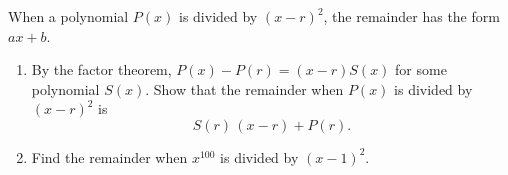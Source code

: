 When a polynomial $P(x)$ is divided by $(x-r)^2$, the remainder has the form $ax+b$.
\begin{enumerate}
\item[(a)] By the factor theorem, $P(x)-P(r)=(x-r)S(x)$ for some polynomial $S(x)$. Show that the remainder when $P(x)$ is divided by $(x-r)^2$ is
\[S(r)\,(x-r)+P(r).\]
\item[(b)] Find the remainder when $x^{100}$ is divided by $(x-1)^2$.
\end{enumerate}

